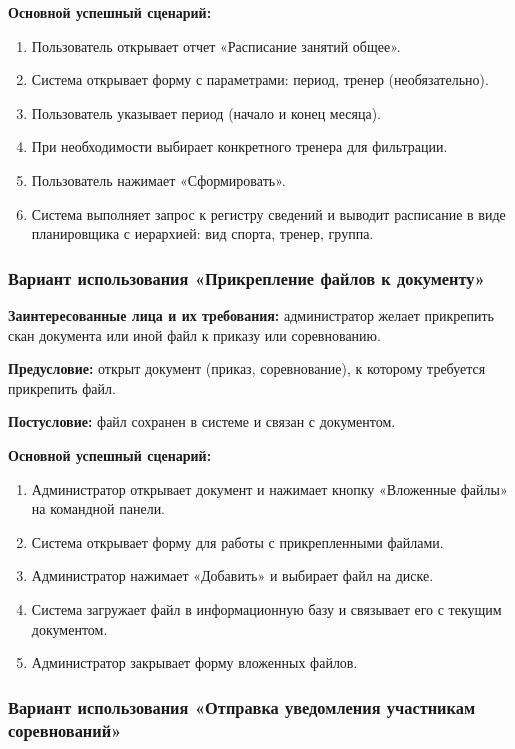 \textbf{Основной успешный сценарий:}

\begin{enumerate}
	\item Пользователь открывает отчет «Расписание занятий общее».
	\item Система открывает форму с параметрами: период, тренер (необязательно).
	\item Пользователь указывает период (начало и конец месяца).
	\item При необходимости выбирает конкретного тренера для фильтрации.
	\item Пользователь нажимает «Сформировать».
	\item Система выполняет запрос к регистру сведений и выводит расписание в виде планировщика с иерархией: вид спорта, тренер, группа.
\end{enumerate}

\subsubsection{Вариант использования «Прикрепление файлов к документу»}

\textbf{Заинтересованные лица и их требования:} администратор желает прикрепить скан документа или иной файл к приказу или соревнованию.

\textbf{Предусловие:} открыт документ (приказ, соревнование), к которому требуется прикрепить файл.

\textbf{Постусловие:} файл сохранен в системе и связан с документом.

\textbf{Основной успешный сценарий:}

\begin{enumerate}
	\item Администратор открывает документ и нажимает кнопку «Вложенные файлы» на командной панели.
	\item Система открывает форму для работы с прикрепленными файлами.
	\item Администратор нажимает «Добавить» и выбирает файл на диске.
	\item Система загружает файл в информационную базу и связывает его с текущим документом.
	\item Администратор закрывает форму вложенных файлов.
\end{enumerate}

\subsubsection{Вариант использования «Отправка уведомления участникам соревнований»}

